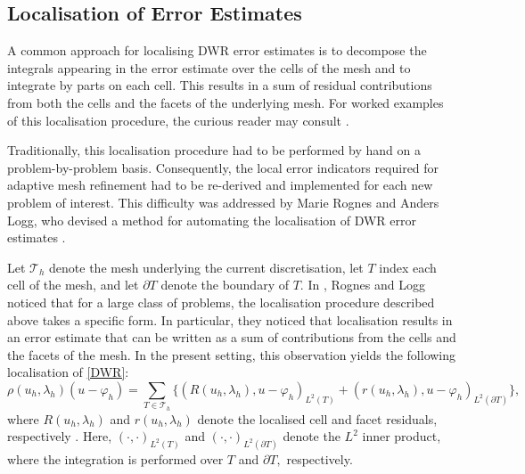 \subsection{Localisation of Error Estimates}


A common approach for localising DWR error estimates is to decompose the integrals appearing in the error estimate over the cells of the mesh and to integrate by parts on each cell. This results in a sum of residual contributions from both the cells and the facets of the underlying mesh.  For worked examples of this localisation procedure, the curious reader may consult \cite{Bangerth, Heuveline, logg, joe}. 


Traditionally, this localisation procedure had to be performed by hand on a problem-by-problem basis. Consequently, the local error indicators required for adaptive mesh refinement had to be re-derived and implemented for each new problem of interest. This difficulty was addressed by Marie Rognes and Anders Logg, who devised a method for automating the localisation of DWR error estimates \cite{logg}. 


Let $\mathcal{T}_h$ denote the mesh underlying the current discretisation, let $T$ index each cell of the mesh, and let $\partial T$ denote the boundary of $T.$ In \cite{logg}, Rognes and Logg noticed that for a large class of problems, the localisation procedure described above takes a specific form. In particular, they noticed that localisation results in an error estimate that can be written as a sum of contributions from the cells and the facets of the mesh. In the present setting, this observation yields the following localisation of \eqref{DWR}:
\begin{equation}
    \rho(u_h, \lambda_h)(u - \varphi_h) = \sum_{T \in \mathcal{T}_h} \{ (R(u_h, \lambda_h), u - \varphi_h)_{L^2(T)} + (r(u_h, \lambda_h), u-\varphi_h)_{L^2(\partial T)}\},
\end{equation}
where $R(u_h, \lambda_h)$ and $r(u_h, \lambda_h)$ denote the localised cell and facet residuals, respectively \cite{joe}. Here, $(\cdot, \cdot)_{L^2(T)}$ and $(\cdot, \cdot)_{L^2(\partial T)}$ denote the $L^2$ inner product, where the integration is performed over $T$ and $\partial T,$ respectively. 

